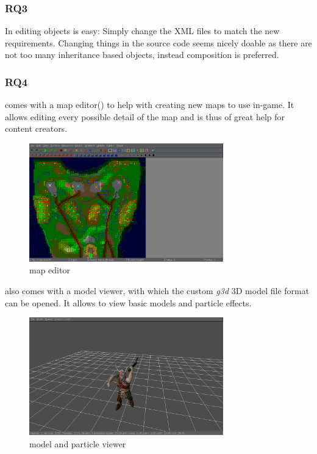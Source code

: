 \subsubsection{RQ3}
In \GLEST{} editing objects is easy: Simply change the XML files to match the new requirements. Changing things in the
source code seems nicely doable as there are not too many inheritance based objects, instead composition is preferred.

\subsubsection{RQ4}
\GLEST{} comes with a map editor() to help with creating new maps to use in-game. It allows editing every possible detail
of the map and is thus of great help for content creators. 
\begin{figure}[H]
    \centering
    \includegraphics[width=0.75\textwidth]{pics/glesteditor}
    \caption{\GLEST{} map editor}
    \label{fig:glestmapeditor}
\end{figure}

\GLEST{} also comes with a model viewer, with which the
custom \textit{g3d} 3D model file format can be opened. It allows to view basic models and particle effects.

\begin{figure}[H]
    \centering
    \includegraphics[width=0.75\textwidth]{pics/glestmodelviewer}
    \caption{\GLEST{} model and particle viewer}
    \label{fig:glestmodelviewer}
\end{figure}


